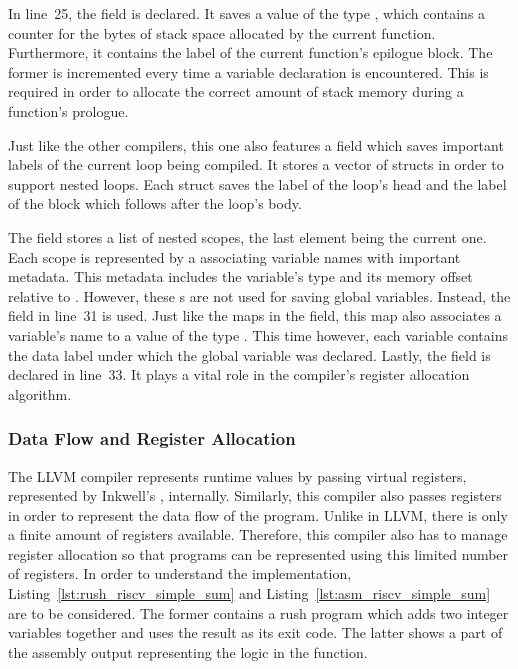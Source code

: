 In line~25, the  field is declared.
It saves a value of the type , which contains a counter for the bytes of stack space allocated by the current function.
Furthermore, it contains the label of the current function's epilogue block.
The former is incremented every time a variable declaration is encountered.
This is required in order to allocate the correct amount of stack memory during a function's prologue.

Just like the other compilers, this one also features a  field which saves important labels of the current loop being compiled.
It stores a vector of  structs in order to support nested loops.
Each  struct saves the label of the loop's head and the label of the block which follows after the loop's body.

The  field stores a list of nested scopes, the last element being the current one.
Each scope is represented by a  associating variable names with important metadata.
This metadata includes the variable's type and its memory offset relative to .
However, these s are not used for saving global variables.
Instead, the  field in line~31 is used.
Just like the maps in the  field, this map also associates a variable's name to a value of the type .
This time however, each variable contains the data label under which the global variable was declared.
Lastly, the  field is declared in line~33.
It plays a vital role in the compiler's register allocation algorithm.

\subsubsection{Data Flow and Register Allocation}

The LLVM compiler represents runtime values by passing virtual registers, represented by Inkwell's , internally.
Similarly, this compiler also passes registers in order to represent the data flow of the program.
Unlike in LLVM, there is only a finite amount of registers available.
Therefore, this compiler also has to manage register allocation so that programs can be represented using this limited number of registers.
In order to understand the implementation, Listing~\ref{lst:rush_riscv_simple_sum} and Listing~\ref{lst:asm_riscv_simple_sum} are to be considered.
The former contains a rush program which adds two integer variables together and uses the result as its exit code.
The latter shows a part of the assembly output representing the logic in the  function.

